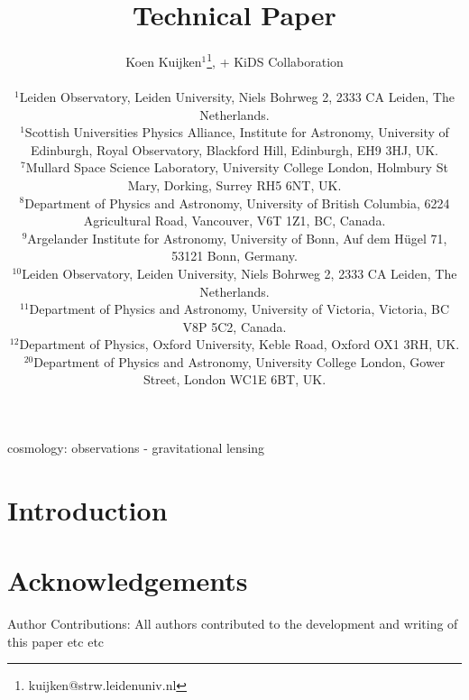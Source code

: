 \documentclass[useAMS,usenatbib,times,letter,amssymb]{mn2e}
\title[KiDS]{Technical Paper}
\author[K. Kuijken et al.]{Koen Kuijken$^{1}$\thanks{kuijken@strw.leidenuniv.nl}, + KiDS Collaboration\\
\\
$^{1}$Leiden Observatory, Leiden University, Niels Bohrweg 2, 2333 CA Leiden, The Netherlands.\\
$^1$Scottish Universities Physics Alliance, Institute for Astronomy, University of Edinburgh, Royal Observatory, Blackford Hill, Edinburgh, EH9 3HJ, UK.\\ 
$^7$Mullard Space Science Laboratory, University College London, Holmbury St Mary, Dorking, Surrey RH5 6NT, UK.\\
$^8$Department of Physics and Astronomy, University of British Columbia, 6224 Agricultural Road, Vancouver, V6T 1Z1, BC, Canada.\\  
$^9$Argelander Institute for Astronomy, University of Bonn, Auf dem H{\"u}gel 71, 53121 Bonn, Germany.\\
$^{10}$Leiden Observatory, Leiden University, Niels Bohrweg 2, 2333 CA Leiden, The Netherlands.\\
$^{11}$Department of Physics and Astronomy, University of Victoria, Victoria, BC V8P 5C2, Canada.\\
$^{12}$Department of Physics, Oxford University, Keble Road, Oxford OX1 3RH, UK.\\ 
$^{20}$Department of Physics and Astronomy, University College London, Gower Street, London WC1E 6BT, UK.\\
}
\begin{document}
\maketitle

\begin{abstract}

\end{abstract}


\begin{keywords}
cosmology: observations - gravitational lensing 
\end{keywords}

\section{Introduction}
\label{sec:intro}

\section{Acknowledgements}

{\small Author Contributions: All authors contributed to the development and writing of this paper etc etc}



\label{lastpage}
\end{document}
